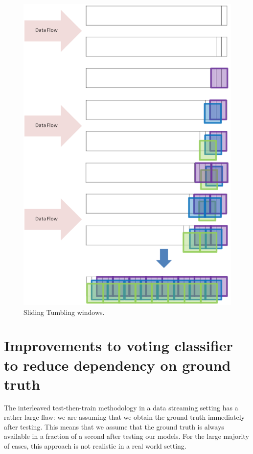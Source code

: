\begin{figure}
  \includegraphics[width=\linewidth]{./Figures/sliding_tumbling_windows.png}
  \caption{Sliding Tumbling windows.}
  \label{fig:sliding_tumbling_windows}
\end{figure}




\section{Improvements to voting classifier to reduce dependency on ground truth}

The interleaved test-then-train methodology in a data streaming setting has a rather large flaw: we are assuming that we obtain the ground truth immediately after testing. This means that we assume that the ground truth is always available in a fraction of a second after testing our models. For the large majority of cases, this approach is not realistic in a real world setting.

